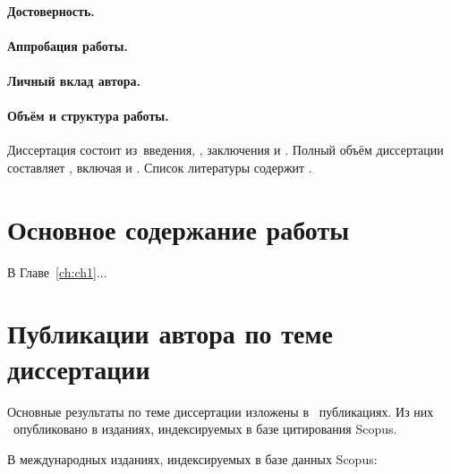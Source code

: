\paragraph*{Достоверность.}
\paragraph*{Аппробация работы.}
\paragraph*{Личный вклад автора.}


\paragraph*{Объём и структура работы.}
Диссертация состоит из~введения,
,
заключения и
.
%
Полный объём диссертации составляет
, включая
 и
.
Список литературы содержит
.




\newpage
\section*{Основное содержание работы}

В Главе~\ref{ch:ch1}...

\section*{Публикации автора по теме диссертации}


Основные результаты по теме диссертации изложены в \theAllMyPapers~публикациях. 
Из них
\theScopusPapers~опубликовано в изданиях, индексируемых в базе цитирования Scopus. 

В международных изданиях, индексируемых в базе данных Scopus:
\begin{refsection}
\nocite{*}
\printbibliography[
    keyword=scopus,
    heading=none,
    resetnumbers=true
]
\end{refsection}



